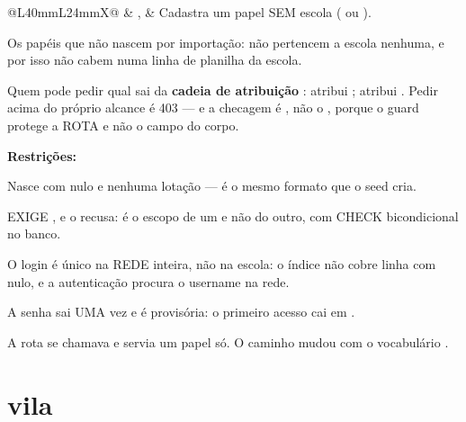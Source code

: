 \begin{tabularx}{\linewidth}{@{}L{40mm}L{24mm}X@{}}
\zebra {} & ,  & Cadastra um papel SEM escola ( ou ).\par Os papéis que não nascem por importação: não pertencem a escola nenhuma, e por isso não cabem numa linha de planilha da escola.\par Quem pode pedir qual sai da \textbf{cadeia de atribuição} :  atribui ;  atribui . Pedir acima do próprio alcance é 403 --- e a checagem é , não o , porque o guard protege a ROTA e não o campo  do corpo.\par \textbf{Restrições:}\par \hspace*{1em}\textbullet{} Nasce com  nulo e nenhuma lotação --- é o mesmo formato que o seed cria.\par \hspace*{1em}\textbullet{}  EXIGE , e  o recusa: é o escopo de um e não do outro, com CHECK bicondicional no banco.\par \hspace*{1em}\textbullet{} O login é único na REDE inteira, não na escola: o índice  não cobre linha com  nulo, e a autenticação procura o username na rede.\par \hspace*{1em}\textbullet{} A senha sai UMA vez e é provisória: o primeiro acesso cai em .\par \hspace*{1em}\textbullet{} A rota se chamava  e servia um papel só. O caminho mudou com o vocabulário .\\
\bottomrule
\end{tabularx}

\section{vila}

